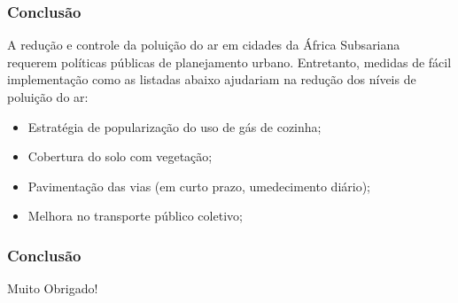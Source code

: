 \begin{frame}
  \frametitle{Conclusão}
  A redução e controle da poluição do ar em cidades da África Subsariana requerem políticas públicas de planejamento urbano. Entretanto, medidas de fácil implementação como as listadas abaixo ajudariam na redução dos níveis de poluição do ar:
  \begin{itemize}
    \item Estratégia de popularização do uso de gás de cozinha;
    \item Cobertura do solo com vegetação;
    \item Pavimentação das vias (em curto prazo, umedecimento diário);
    \item Melhora no transporte público coletivo;
  \end{itemize}
\end{frame}



\begin{frame}
  \frametitle{Conclusão}
  \begin{center}
    Muito Obrigado!
  \end{center}
\end{frame}
